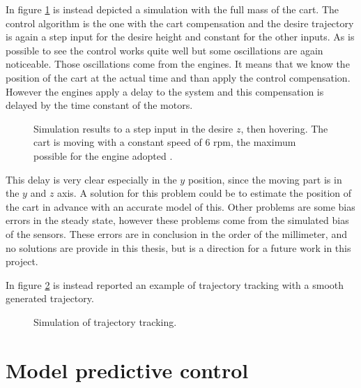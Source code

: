 \noindent In figure \ref{fig:simulation2} is instead depicted a simulation with the full mass of the cart. The control algorithm is the one with the cart compensation and the desire trajectory is again a step input for the desire height and constant for the other inputs. As is possible to see the control works quite well but some oscillations are again noticeable. Those oscillations come from the engines. It means that we know the position of the cart at the actual time and than apply the control compensation. However the engines apply a delay to the system and this compensation is delayed by the time constant of the motors. 

\begin{figure}[h]
	\centering
 	
 	\caption{Simulation results to a step input in the desire $z$, then hovering. The cart is moving with a constant speed of $6$ rpm, the maximum possible for the engine adopted \cite{Carlos}.}
 	\label{fig:simulation2}		
\end{figure}

\noindent This delay is very clear especially in the $y$ position, since the moving part is in the $y$ and $z$ axis. A solution for this problem could be to estimate the position of the cart in advance with an accurate model of this. Other problems are some bias errors in the steady state, however these problems come from the simulated bias of the sensors. These errors are in conclusion in the order of the millimeter, and no solutions are provide in this thesis, but is a direction for a future work in this project.

\noindent In figure \ref{fig:trajectoryTrackingLee} is instead reported an example of trajectory tracking with a smooth generated trajectory.

\begin{figure}[h!]
	\centering
	
	\caption{Simulation of trajectory tracking.}
	\label{fig:trajectoryTrackingLee}		
\end{figure}


\section{Model predictive control}

